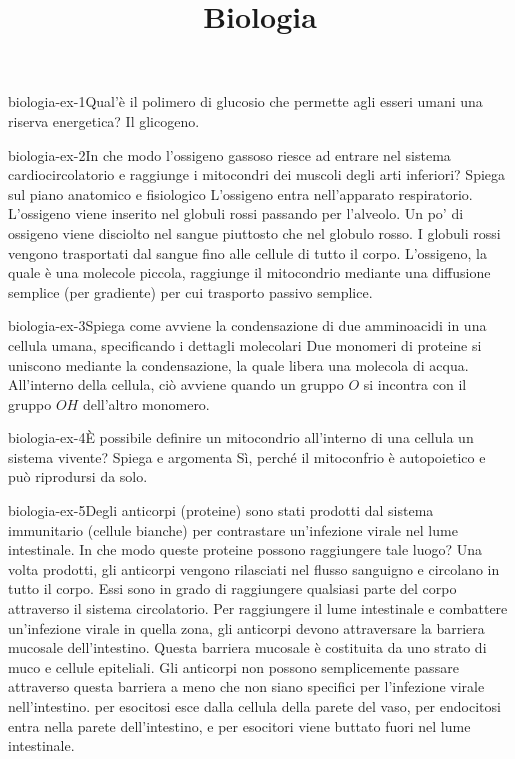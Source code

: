 \documentclass[preview]{standalone}
\begin{document}
\title{Biologia}
\genpage

\begin{snippetexercise}{biologia-ex-1}{Qual'è il polimero di glucosio che permette agli esseri umani una riserva energetica?}
    Il glicogeno.
\end{snippetexercise}

\begin{snippetexercise}{biologia-ex-2}{In che modo l'ossigeno gassoso riesce ad entrare nel sistema cardiocircolatorio e raggiunge i mitocondri dei muscoli degli arti inferiori? Spiega sul piano anatomico e fisiologico}
    L'ossigeno entra nell'apparato respiratorio.
    L'ossigeno viene inserito nel globuli rossi passando per l'alveolo.
    Un po' di ossigeno viene disciolto nel sangue piuttosto che nel globulo rosso.
    I globuli rossi vengono trasportati dal sangue fino alle cellule di tutto il corpo.
    L'ossigeno, la quale è una molecole piccola, raggiunge il mitocondrio mediante una diffusione semplice (per gradiente) per cui trasporto passivo semplice.
\end{snippetexercise}

\begin{snippetexercise}{biologia-ex-3}{Spiega come avviene la condensazione di due amminoacidi in una cellula umana, specificando i dettagli molecolari}
    Due monomeri di proteine si uniscono mediante la condensazione, la quale libera una molecola di acqua.
    All'interno della cellula, ciò avviene quando un gruppo \(O\) si incontra con il gruppo \(OH\) dell'altro monomero.
\end{snippetexercise}

\begin{snippetexercise}{biologia-ex-4}{È possibile definire un mitocondrio all'interno di una cellula un sistema vivente? Spiega e argomenta}
    Sì, perché il mitoconfrio è autopoietico e può riprodursi da solo.
\end{snippetexercise}

\begin{snippetexercise}{biologia-ex-5}{Degli anticorpi (proteine) sono stati prodotti dal sistema immunitario (cellule bianche) per contrastare un'infezione virale nel lume intestinale. In che modo queste proteine possono raggiungere tale luogo?}
    Una volta prodotti, gli anticorpi vengono rilasciati nel flusso sanguigno e circolano in tutto il corpo. Essi sono in grado di raggiungere qualsiasi parte del corpo attraverso il sistema circolatorio.
    Per raggiungere il lume intestinale e combattere un'infezione virale in quella zona, gli anticorpi devono attraversare la barriera mucosale dell'intestino. Questa barriera mucosale è costituita da uno strato di muco e cellule epiteliali. Gli anticorpi non possono semplicemente passare attraverso questa barriera a meno che non siano specifici per l'infezione virale nell'intestino.
    per esocitosi esce dalla cellula della parete del vaso, per endocitosi entra nella parete dell'intestino, e per esocitori viene buttato fuori nel lume intestinale.
\end{snippetexercise}
\end{document}
